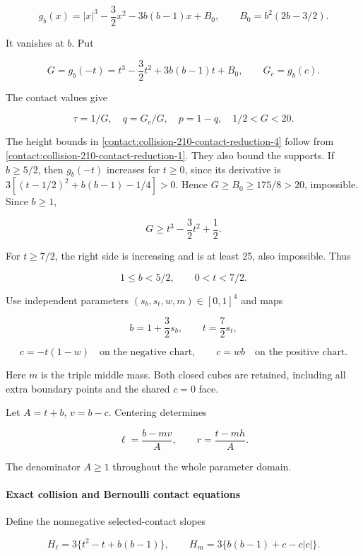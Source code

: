 \[
 g_b(x)=|x|^3-\frac32x^2-3b(b-1)x+B_0,
 \qquad B_0=b^2(2b-3/2).
\tag{B.16.3}\label{contact:collision-210-contact-reduction-3}
\]

It vanishes at $b$. Put

\[
 G=g_b(-t)=t^3-\frac32t^2+3b(b-1)t+B_0,
 \qquad G_c=g_b(c).
\]

The contact values give

\[
 \boxed{\quad \tau=1/G,\quad q=G_c/G,\quad p=1-q,
                  \quad 1/2<G<20.\quad}
\tag{B.16.4}\label{contact:collision-210-contact-reduction-4}
\]

The height bounds in \eqref{contact:collision-210-contact-reduction-4} follow from \eqref{contact:collision-210-contact-reduction-1}. They also bound the supports. If $b\ge 5/2$, then
$g_b(-t)$ increases for $t\ge 0$, since its derivative is
$3[(t-1/2)^2+b(b-1)-1/4]>0$. Hence
$G\ge B_0\ge 175/8>20$, impossible. Since $b\ge 1$,

\[
 G\geq t^3-\frac32t^2+\frac12.
\]

For $t\ge 7/2$, the right side is increasing and is at least 25,
also impossible. Thus

\[
 1\leq b<5/2,\qquad 0<t<7/2.
\tag{B.16.5}\label{contact:collision-210-contact-reduction-5}
\]

Use independent parameters $(s_b,s_t,w,m) \in [0,1]^4$ and maps

\[
 b=1+\frac32s_b,\qquad t=\frac72s_t,
\]

\[
 c=-t(1-w)\quad\text{on the negative chart},\qquad
 c=wb\quad\text{on the positive chart}.
\tag{B.16.6}\label{contact:collision-210-contact-reduction-6}
\]

Here $m$ is the triple middle mass. Both closed cubes are retained,
including all extra boundary points and the shared $c=0$ face.

Let $A=t+b$, $v=b-c$. Centering determines

\[
 \ell=\frac{b-mv}{A},\qquad r=\frac{t-mh}{A}.
\tag{B.16.7}\label{contact:collision-210-contact-reduction-7}
\]

The denominator $A\ge 1$ throughout the whole parameter domain.

\paragraph{Exact collision and Bernoulli contact equations}

Define the nonnegative selected-contact slopes

\[
 H_{\ell}=3\{t^2-t+b(b-1)\},\qquad
 H_m=3\{b(b-1)+c-c|c|\}.
\]


